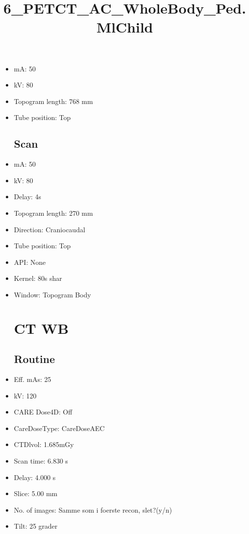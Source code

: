 \documentclass[12pt]{article}
\title{6\_PETCT\_AC\_WholeBody\_Ped.MlChild}
\begin{document}
\maketitle
\newpage
\tableofcontents
\newpage
{}


\begin{itemize}\section{Topogram}
\subsection{Routine}
\item mA: 50\item kV: 80\item Topogram length: 768 mm\item Tube position: Top
\subsection{Scan}\item mA: 50\item kV: 80\item Delay: 4s\item Topogram length: 270 mm\item Direction: Craniocaudal\item Tube position: Top\item API: None\item Kernel: 80s shar\item Window: Topogram Body
\section{CT WB}
\subsection{Routine}
\item Eff. mAs: 25\item kV: 120\item CARE Dose4D: Off\item CareDoseType: CareDoseAEC\item CTDlvol: 1.685mGy\item Scan time: 6.830 s\item Delay: 4.000 s\item Slice: 5.00 mm\item No. of images: Samme som i foerste recon, slet?(y/n)\item Tilt: 25 grader

\end{itemize}
\end{document}
